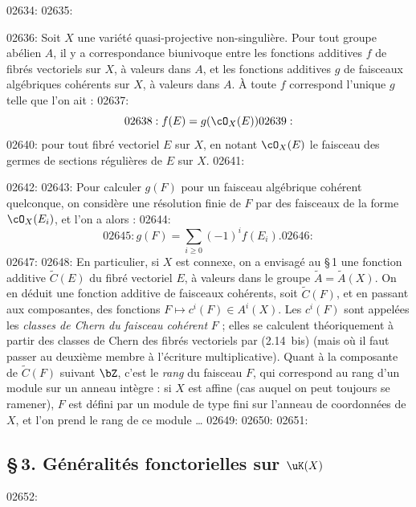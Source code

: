 02634: 
02635: \begin{corollaire}\label{cor:2.3.2}
02636: Soit $X$ une vari\'et\'e quasi-projective non-singuli\`ere. Pour tout groupe ab\'elien $A$, il y a correspondance biunivoque entre les fonctions additives $f$ de fibr\'es vectoriels sur $X$, \`a valeurs dans $A$, et les fonctions additives $g$ de faisceaux alg\'ebriques coh\'erents sur $X$, \`a valeurs dans $A$. \`A toute $f$ correspond l'unique $g$ telle que l'on ait :
02637: \begin{equation}\label{eq:2.14}
02638: f(E) = g(\cO_X(E))
02639: \end{equation}
02640: pour tout fibr\'e vectoriel $E$ sur $X$, en notant $\cO_X(E)$ le faisceau des germes de sections r\'eguli\`eres de $E$ sur $X$.
02641: \end{corollaire}
02642: 
02643: Pour calculer $g(F)$ pour un faisceau alg\'ebrique coh\'erent quelconque, on consid\`ere une r\'esolution finie de $F$ par des faisceaux de la forme $\cO_X(E_i)$, et l'on a alors :
02644: \begin{equation}\label{eq:2.14bis}
02645: g(F) = \sum_{i \geq 0} (-1)^i f(E_i).
02646: \end{equation}
02647: 
02648: En particulier, si $X$ est connexe, on a envisag\'e au \S\,1 une fonction additive $\widetilde{C}(E)$ du fibr\'e vectoriel $E$, \`a valeurs dans le groupe $\widetilde{A} = \widetilde{A}(X)$. On en d\'eduit une fonction additive de faisceaux coh\'erents, soit $\widetilde{C}(F)$, et en passant aux composantes, des fonctions $F \mapsto c^i(F) \in A^i(X)$. Les $c^i(F)$ sont appel\'ees les \emph{classes de Chern du faisceau coh\'erent} $F$ ; elles se calculent th\'eoriquement \`a partir des classes de Chern des fibr\'es vectoriels par (2.14~bis) (mais o\`u il faut passer au deuxi\`eme membre \`a l'\'ecriture multiplicative). Quant \`a la composante de $\widetilde{C}(F)$ suivant $\bZ$, c'est le \emph{rang} du faisceau $F$, qui correspond au rang d'un module sur un anneau int\`egre : si $X$ est affine (cas auquel on peut toujours se ramener), $F$ est d\'efini par un module de type fini sur l'anneau de coordonn\'ees de $X$, et l'on prend le rang de ce module \ldots
02649: 
02650: %
02651: \subsection*{\S\,3. G\'en\'eralit\'es fonctorielles sur $\uK(X)$}
02652: 
